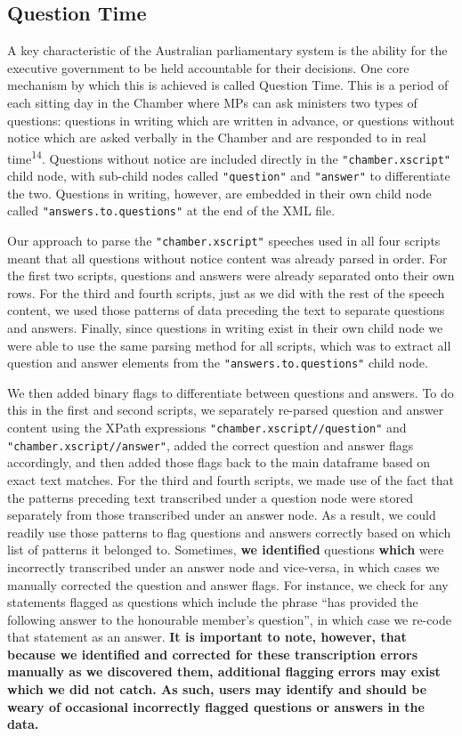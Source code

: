 \documentclass[
  letterpaper,
  DIV=11,
  numbers=noendperiod]{scrartcl}
\begin{document}
\hypertarget{sec-qa}{%
\subsection{Question Time}\label{sec-qa}}

A key characteristic of the Australian parliamentary system is the
ability for the executive government to be held accountable for their
decisions. One core mechanism by which this is achieved is called
Question Time. This is a period of each sitting day in the Chamber where
MPs can ask ministers two types of questions: questions in writing which
are written in advance, or questions without notice which are asked
verbally in the Chamber and are responded to in real
time\textsuperscript{14}. Questions without notice are included directly
in the \texttt{"chamber.xscript"} child node, with sub-child nodes
called \texttt{"question"} and \texttt{"answer"} to differentiate the
two. Questions in writing, however, are embedded in their own child node
called \texttt{"answers.to.questions"} at the end of the XML file.

Our approach to parse the \texttt{"chamber.xscript"} speeches used in
all four scripts meant that all questions without notice content was
already parsed in order. For the first two scripts, questions and
answers were already separated onto their own rows. For the third and
fourth scripts, just as we did with the rest of the speech content, we
used those patterns of data preceding the text to separate questions and
answers. Finally, since questions in writing exist in their own child
node we were able to use the same parsing method for all scripts, which
was to extract all question and answer elements from the
\texttt{"answers.to.questions"} child node.

We then added binary flags to differentiate between questions and
answers. To do this in the first and second scripts, we separately
re-parsed question and answer content using the XPath expressions
\texttt{"chamber.xscript//question"} and
\texttt{"chamber.xscript//answer"}, added the correct question and
answer flags accordingly, and then added those flags back to the main
dataframe based on exact text matches. For the third and fourth scripts,
we made use of the fact that the patterns preceding text transcribed
under a question node were stored separately from those transcribed
under an answer node. As a result, we could readily use those patterns
to flag questions and answers correctly based on which list of patterns
it belonged to. Sometimes, \textbf{we identified} questions
\textbf{which} were incorrectly transcribed under an answer node and
vice-versa, in which cases we manually corrected the question and answer
flags. For instance, we check for any statements flagged as questions
which include the phrase ``has provided the following answer to the
honourable member's question'', in which case we re-code that statement
as an answer. \textbf{It is important to note, however, that because we
identified and corrected for these transcription errors manually as we
discovered them, additional flagging errors may exist which we did not
catch. As such, users may identify and should be weary of occasional
incorrectly flagged questions or answers in the data.}
\end{document}
